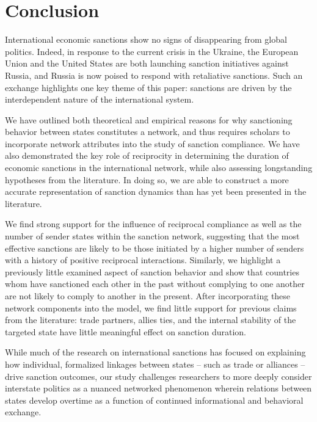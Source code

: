 \section*{Conclusion}
\label{conclusion}

International economic sanctions show no signs of disappearing from global politics. Indeed, in response to the current crisis in the Ukraine, the European Union and the United States are both launching sanction initiatives against Russia, and Russia is now poised to respond with retaliative sanctions. Such an exchange highlights one key theme of this paper: sanctions are driven by the interdependent nature of the international system. 

We have outlined both theoretical and empirical reasons for why sanctioning behavior between states constitutes a network, and thus requires scholars to incorporate network attributes into the study of sanction compliance. We have also demonstrated the key role of reciprocity in determining the duration of economic sanctions in the international network, while also assessing longstanding hypotheses from the literature. In doing so, we are able to construct a more accurate representation of sanction dynamics than has yet been presented in the literature. 

We find strong support for the influence of reciprocal compliance as well as the number of sender states within the sanction network, suggesting that the most effective sanctions are likely to be those initiated by a higher number of senders with a history of positive reciprocal interactions. Similarly, we highlight a previously little examined aspect of sanction behavior and show that countries whom have sanctioned each other in the past without complying to one another are not likely to comply to another in the present. After incorporating these network components into the model, we  find little support for previous claims from the literature: trade partners, allies ties, and the internal stability of the targeted state have little meaningful effect on sanction duration.


While much of the research on international sanctions has focused on explaining how individual, formalized linkages between states -- such as trade or alliances -- drive sanction outcomes, our study challenges researchers to more deeply consider interstate politics as a nuanced networked phenomenon wherein relations between states develop overtime as a function of continued informational and behavioral exchange. 

